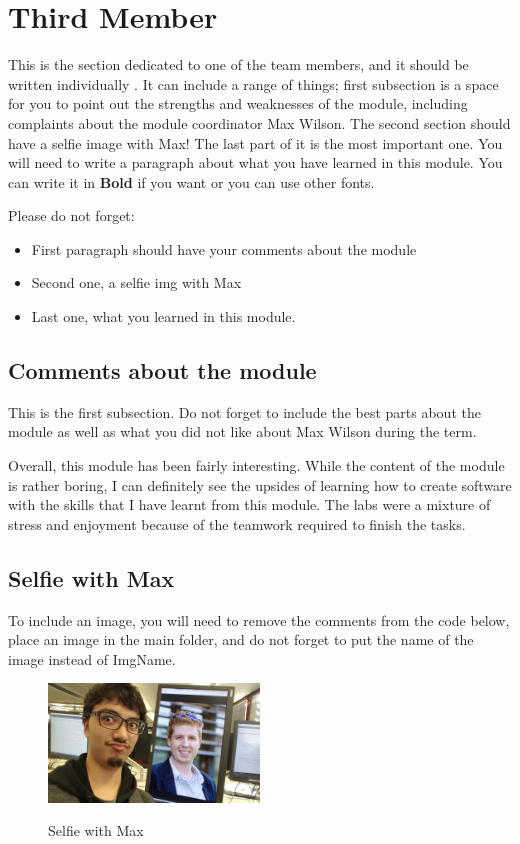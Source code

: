 \section{Third Member}
This is the section dedicated to one of the team members, and it should be written individually . It can include a range of things; first subsection is a space for you to point out the strengths and weaknesses of the module, including complaints about the module coordinator Max Wilson. The second section should have a selfie image with Max! The last part of it is the most important one. You will need to write a paragraph about what you have learned in this module. You can write it in \textbf{Bold} if you want or you can use other fonts. 

Please do not forget:
\begin{itemize}
	\item First paragraph should have your comments about the module
	\item Second one, a selfie img with Max
	\item Last one, what you learned in this module.
\end{itemize}

\subsection{Comments about the module}
This is the first subsection. Do not forget to include the best parts about the module as well as what you did not like about Max Wilson during the term.

Overall, this module has been fairly interesting. While the content of the module is rather boring, I can definitely see the upsides of learning how to create software with the skills that I have learnt from this module. The labs were a mixture of stress and enjoyment because of the teamwork required to finish the tasks. 

\subsection{Selfie with Max}

To include an image, you will need to remove the comments from the code below, place an image in the main folder, and do not forget to put the name of the image instead of ImgName. 

\begin{figure}[h]
\caption{Selfie with Max}
\centering
\includegraphics[angle = 180, width=0.5\textwidth]{psyjk4selfie}
\label{fig:selfie}
\end{figure}

